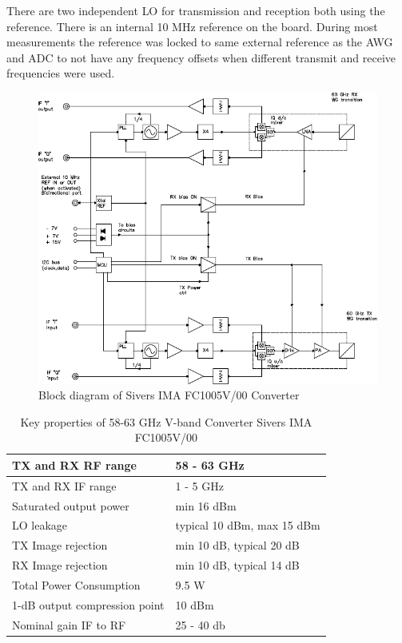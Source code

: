 There are two independent \gls{LO} for transmission and reception both using
the reference. There is an internal 10 MHz reference on the board. During
most measurements the reference was locked to same external reference as the
\gls{AWG} and \gls{ADC} to not have any frequency offsets when different
transmit and receive frequencies were used.

\begin{figure}
  \centering
  \includegraphics[width=\textwidth]{figures/sivers_block_diagram}
  \caption{Block diagram of Sivers IMA FC1005V/00 Converter}
  \label{fig:sivers}
\end{figure}

\begin{table}[h]
  \centering
  \begin{tabular}{|l|l|}
    \hline
    \gls{TX} and \gls{RX} \gls{RF} range & 58 - 63 GHz \\ \hline
    \gls{TX} and \gls{RX} \gls{IF} range & 1 - 5 GHz \\ \hline
    Saturated output power & min 16 dBm \\ \hline
    \gls{LO} leakage & typical 10 dBm, max 15 dBm \\ \hline
    \gls{TX} Image rejection & min 10 dB, typical 20 dB \\ \hline
    \gls{RX} Image rejection & min 10 dB, typical 14 dB \\ \hline
    Total Power Consumption & 9.5 W \\ \hline
    1-dB output compression point & 10 dBm \\ \hline
    Nominal gain \gls{IF} to \gls{RF} & 25 - 40 db \\ \hline
  \end{tabular}
  \caption{Key properties of 58-63 GHz V-band Converter Sivers IMA FC1005V/00}
  \label{tab:awg}
\end{table}

